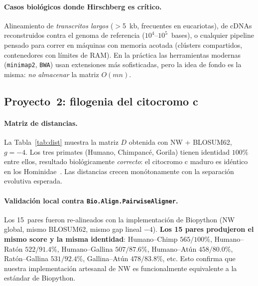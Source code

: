 \documentclass[11pt,a4paper]{article}
\begin{document}
\paragraph{Casos biol\'ogicos donde Hirschberg es cr\'itico.} Alineamiento de \emph{transcritos largos} ($>$5~kb, frecuentes en eucariotas), de cDNAs reconstruidos contra el genoma de referencia ($10^4$--$10^5$~bases), o cualquier pipeline pensado para correr en m\'aquinas con memoria acotada (cl\'usters compartidos, contenedores con l\'imites de RAM). En la pr\'actica las herramientas modernas (\texttt{minimap2}, \texttt{BWA}) usan extensiones m\'as sofisticadas, pero la idea de fondo es la misma: \emph{no almacenar} la matriz $O(mn)$.

\subsection{Proyecto~2: filogenia del citocromo c}

\paragraph{Matriz de distancias.}
La Tabla~\ref{tab:dist} muestra la matriz $D$ obtenida con NW + BLOSUM62, $g=-4$. Los tres primates (Humano, Chimpanc\'e, Gorila) tienen identidad $100\%$ entre ellos, resultado biol\'ogicamente \emph{correcto}: el citocromo c maduro es id\'entico en los Hominidae~\cite{margoliashsmith1965}. Las distancias crecen mon\'otonamente con la separaci\'on evolutiva esperada.


\label{tab:dist}

\paragraph{Validaci\'on local contra \texttt{Bio.Align.PairwiseAligner}.}
Los 15~pares fueron re-alineados con la implementaci\'on de Biopython (NW global, mismo BLOSUM62, mismo gap lineal $-4$). \textbf{Los 15 pares produjeron el mismo score y la misma identidad}: Humano--Chimp $565/100\%$, Humano--Rat\'on $522/91.4\%$, Humano--Gallina $507/87.6\%$, Humano--At\'un $458/80.0\%$, Rat\'on--Gallina $531/92.4\%$, Gallina--At\'un $478/83.8\%$, etc. Esto confirma que nuestra implementaci\'on artesanal de NW es funcionalmente equivalente a la est\'andar de Biopython.
\end{document}
